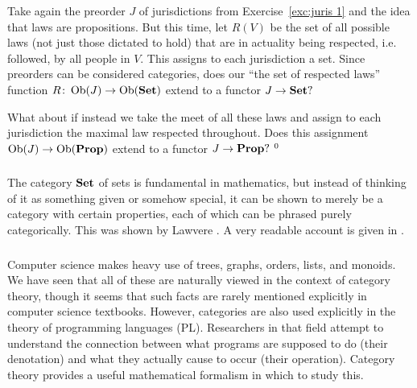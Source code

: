 \documentclass[../main/CT4S-EN-RU]{subfiles}
\begin{document}
\begin{exerciseENG}\label{exc:juris 2}
Take again the preorder $J$ of jurisdictions from Exercise~\ref{exc:juris 1} and the idea that laws are propositions. But this time, let $R(V)$ be the set of all possible laws (not just those dictated to hold) that are in actuality being respected, i.e. followed, by all people in $V.$ This assigns to each jurisdiction a set.
\sexc Since preorders can be considered categories, does our “the set of respected laws” function $R\colon\operatorname{Ob}(J)\rightarrow\operatorname{Ob}({\mathbf{Set}})$ extend to a functor $J\rightarrow{\mathbf{Set}}?$ 
\item What about if instead we take the meet of all these laws and assign to each jurisdiction the maximal law respected throughout. Does this assignment $\operatorname{Ob}(J)\rightarrow\operatorname{Ob}({\mathbf{Prop}})$ extend to a functor $J\rightarrow{\mathbf{Prop}}?$$~^{\arabic{footnote}}$
\endsexc
\end{exerciseENG}

\begin{exerciseRUS}\label{exc:juris 2}
\end{exerciseRUS}


\subsubsection{}

\begin{blockENG}
The category ${\mathbf{Set}}$ of sets is fundamental in mathematics, but instead of thinking of it as something given or somehow special, it can be shown to merely be a category with certain properties, each of which can be phrased purely categorically. This was shown by Lawvere \cite{Law}. A very readable account is given in \cite{Le2}.
\end{blockENG}

\begin{blockRUS}
\end{blockRUS}


\subsubsection{}

\begin{blockENG}
Computer science makes heavy use of trees, graphs, orders, lists, and monoids. We have seen that all of these are naturally viewed in the context of category theory, though it seems that such facts are rarely mentioned explicitly in computer science textbooks. However, categories are also used explicitly in the theory of programming languages (PL). Researchers in that field attempt to understand the connection between what programs are supposed to do (their denotation) and what they actually cause to occur (their operation). Category theory provides a useful mathematical formalism in which to study this.
\end{blockENG}
\end{document}

